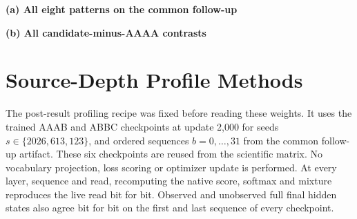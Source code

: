 \documentclass[11pt,letterpaper]{article}
\newcommand{\route}[1]{\textsf{#1}}
\begin{document}
\begin{table}[!htbp]
\centering\small\setlength{\tabcolsep}{3pt}
\textbf{(a) All eight patterns on the common follow-up}\par\smallskip

\par\medskip
\textbf{(b) All candidate-minus-AAAA contrasts}\par\smallskip

\caption{Common-follow-up evaluation at 2,000 updates.
(a) All 24 endpoint losses; bold marks the lowest observed value in each
row, with means weighting seeds equally. (b) All seven comparisons with
\route{AAAA}; SD is the sample SD of the paired seed differences.
The five two-read patterns pass the predeclared practical rule; the
three-read rows remain descriptive. $^{*}$Driver differs from the
\route{AAAA} reference, as specified in Section~\ref{sec:design}; bold
values do not establish driver-controlled superiority. The original nine
checkpoints are reused from Table~\ref{tab:fresh-nine}, and shared
reference scores are reused without retraining or rescoring.}
\label{tab:followup-per-seed}
\label{tab:stage-a-loss}
\label{tab:stage-a-contrast}
\label{tab:stage-b-loss}
\label{tab:stage-b-contrast}
\end{table}
\FloatBarrier

\section{Source-Depth Profile Methods}
\label{app:source-profiles}
The post-result profiling recipe was fixed before reading these weights.
It uses the trained \route{AAAB} and \route{ABBC} checkpoints at update
2,000 for seeds $s\in\{2026,613,123\}$, and ordered sequences $b=0,\ldots,31$
from the common follow-up artifact. These six checkpoints are reused from
the scientific matrix. No vocabulary projection, loss scoring or optimizer
update is performed. At every layer, sequence and read, recomputing the
native score, softmax and mixture reproduces the live read bit for bit.
Observed and unobserved full final hidden states also agree bit for bit on
the first and last sequence of every checkpoint.
\end{document}
